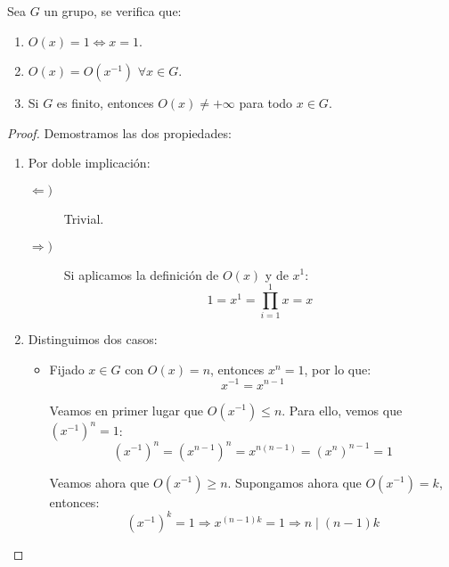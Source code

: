 \begin{prop}\label{prop:orden_grupo}
    Sea $G$ un grupo, se verifica que:
    \begin{enumerate}
        \item $O(x)=1\Longleftrightarrow x=1$.
        \item $O(x)=O(x^{-1})$ $\forall x\in G$. 
        \item Si $G$ es finito, entonces $O(x)\neq +\infty$ para todo $x\in G$. 
    \end{enumerate}
    \begin{proof}
        Demostramos las dos propiedades:
        \begin{enumerate}
            \item Por doble implicación:
                \begin{description}
                    \item [$\Longleftarrow)$] Trivial.
                    \item [$\Longrightarrow)$] Si aplicamos la definición de $O(x)$ y de $x^1$:
                        \begin{equation*}
                            1 = x^1 = \prod_{i=1}^{1} x = x
                        \end{equation*}
                \end{description}
            \item %
                Distinguimos dos casos:
                \begin{itemize}
                    \item Fijado $x\in G$ con $O(x)=n$, entonces $x^n = 1$, por lo que:
                    \begin{equation*}
                        x^{-1} = x^{n-1}
                    \end{equation*}

                    Veamos en primer lugar que $O(x^{-1})\leq n$. Para ello, vemos que $\left(x^{-1}\right)^{n}=1$:
                    \begin{equation*}
                        \left(x^{-1}\right)^{n} = \left(x^{n-1}\right)^{n} = x^{n(n-1)} = {\left(x^n\right)}^{n-1}= 1
                    \end{equation*}

                    Veamos ahora que $O(x^{-1})\geq n$. Supongamos ahora que $O(x^{-1})=k$, entonces:
                    \begin{equation*}
                        (x^{-1})^k = 1 \Longrightarrow x^{(n-1)k} = 1 \Longrightarrow n\mid (n-1)k
                    \end{equation*}


\end{itemize}
\end{enumerate}
\end{proof}
\end{prop}
